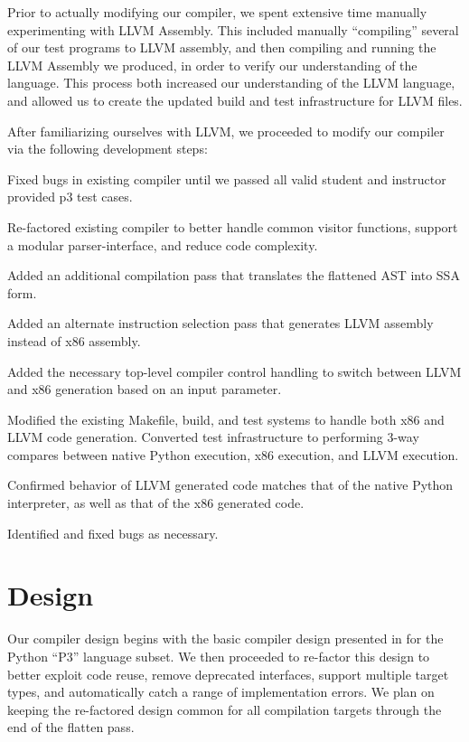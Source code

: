 \documentclass[11pt,twocolumn]{article}
\newenvironment{packed_enum}{
\begin{enumerate}
  \setlength{\itemsep}{1pt}
  \setlength{\parskip}{0pt}
  \setlength{\parsep}{0pt}
}{\end{enumerate}}
\begin{document}
Prior to actually modifying our compiler, we spent extensive time
manually experimenting with LLVM Assembly. This included manually
``compiling'' several of our test programs to LLVM assembly, and then
compiling and running the LLVM Assembly we produced, in order to
verify our understanding of the language. This process both increased
our understanding of the LLVM language, and allowed us to create the
updated build and test infrastructure for LLVM files.

After familiarizing ourselves with LLVM, we proceeded to modify our
compiler via the following development steps:

\begin{packed_enum}
\item Fixed bugs in existing compiler until we passed all valid student
  and instructor provided p3 test cases.
\item Re-factored existing compiler to better handle common visitor
  functions, support a modular parser-interface, and reduce code
  complexity.
\item Added an additional compilation pass that translates the flattened
  AST into SSA form.
\item Added an alternate instruction selection pass that generates LLVM
  assembly instead of x86 assembly.
\item Added the necessary top-level compiler control handling to switch
  between LLVM and x86 generation based on an input parameter.
\item Modified the existing Makefile, build, and test systems to handle
  both x86 and LLVM code generation. Converted test infrastructure to
  performing 3-way compares between native Python execution, x86
  execution, and LLVM execution.
\item Confirmed behavior of LLVM generated code matches that of the
  native Python interpreter, as well as that of the x86 generated
  code.
\item Identified and fixed bugs as necessary.
\end{packed_enum}

\section{Design}
\label{sec:design}

Our compiler design begins with the basic compiler design presented in
\cite{siek-chang} for the Python ``P3'' language subset.  We then
proceeded to re-factor this design to better exploit code reuse,
remove deprecated interfaces, support multiple target types, and
automatically catch a range of implementation errors. We plan on
keeping the re-factored design common for all compilation targets
through the end of the flatten pass.
\end{document}
